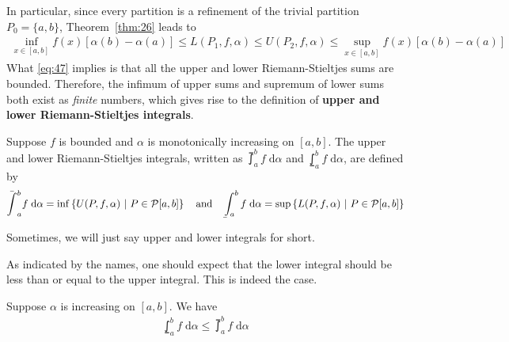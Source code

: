\documentclass[thmcnt=section, 12pt]{my-elegantbook}
\begin{document}

In particular, since every partition is a refinement of the trivial partition $P_0 = \{a, b\}$, Theorem~\ref{thm:26} leads to 
\begin{align}
    \inf_{x\in[a,b]} f(x) [\alpha(b) - \alpha(a)] 
    \leq L(P_1, f, \alpha) \leq U(P_2, f, \alpha)
    \leq \sup_{x\in[a,b]} f(x) [\alpha(b) - \alpha(a)] 
    \label{eq:47}
\end{align}
What \eqref{eq:47} implies is that all the upper and lower Riemann-Stieltjes sums are bounded. Therefore, the infimum of upper sums and supremum of lower sums both exist as \textit{finite} numbers, which gives rise to the definition of \textbf{upper and lower Riemann-Stieltjes integrals}.

\begin{definition}
    Suppose $f$ is bounded and $\alpha$ is monotonically increasing on $[a, b]$. The upper and lower Riemann-Stieltjes integrals, written as $\upint_a^b f \; \mathrm{d}\alpha$ and $\lowint_a^b f \; \mathrm{d}\alpha$, are defined by 
    \begin{align*}
        \upint_a^b f \; \mathrm{d}\alpha
        = \inf \set{U(P,f,\alpha)}{P \in \mathcal{P}[a,b]}
        \quad \text{and} \quad
        \lowint_a^b f \; \mathrm{d}\alpha
        = \sup \set{L(P,f,\alpha)}{P \in \mathcal{P}[a,b]}
    \end{align*}
\end{definition}


Sometimes, we will just say upper and lower integrals for short.

As indicated by the names, one should expect that the lower integral should be less than or equal to the upper integral. This is indeed the case.

\begin{theorem}
    Suppose $\alpha$ is increasing on $[a, b]$. We have 
    \begin{align}
        \lowint_a^b f \; \mathrm{d}\alpha
        \leq \upint_a^b f \; \mathrm{d}\alpha
        \label{eq:48}
    \end{align}
\end{theorem}
\end{document}
